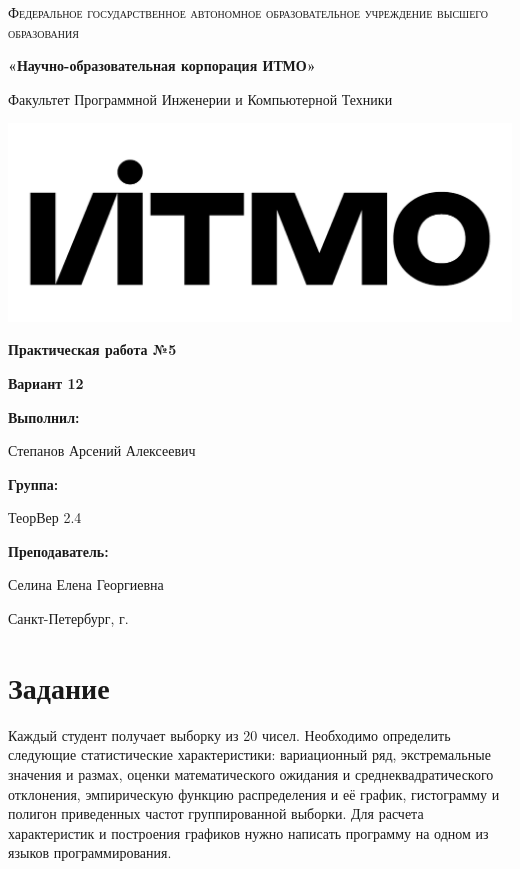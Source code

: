 \documentclass[12pt,a4paper]{report}
\begin{document}
\begin{titlepage} 
	\centering
	{
        \scshape
        Федеральное государственное автономное образовательное учреждение высшего образования
        \par
        \textbf{«Научно-образовательная корпорация ИТМО»}
        \par
        \vspace*{1cm}
        Факультет Программной Инженерии и Компьютерной Техники
        \par
    }
    \vspace*{0.6cm}
    \includegraphics[width=\textwidth]{logo.png}
    {
        \Large
        \textbf{Практическая работа №5}
        \par
        \normalsize
        \vspace*{0.75cm}
        \textbf{Вариант 12}
        \par
    }
    \vfill
    \hfill\begin{minipage}{\dimexpr\textwidth-7.8cm}
        \textbf{Выполнил:}\par
        Степанов Арсений Алексеевич\par
        \vspace*{0.15cm}
        \textbf{Группа:}\par
        ТеорВер 2.4\par
        \vspace*{0.15cm}
        \textbf{Преподаватель:}\par
        Селина Елена Георгиевна\par
    \end{minipage}
    \vfill
    Санкт-Петербург, \the\year{}г.
\end{titlepage}  
\section*{Задание}
Каждый студент получает выборку из 20 чисел. Необходимо определить следующие
статистические характеристики: вариационный ряд, экстремальные значения и размах,
оценки математического ожидания и среднеквадратического отклонения, эмпирическую
функцию распределения и её график, гистограмму и полигон приведенных частот
группированной выборки. Для расчета характеристик и построения графиков нужно
написать программу на одном из языков программирования.
\end{document}
